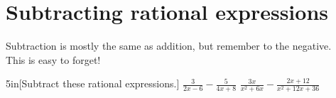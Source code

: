 \section{Subtracting rational expressions}


\begin{myCenteredBox}[width=4.25in,]
    Subtraction is mostly the same as addition, 
    but remember to  the negative.\\
    \vspace{1em}
    This is easy to forget!
\end{myCenteredBox}

\begin{my2Problems}{5in}[Subtract these rational expressions.]
    {
        $
        \frac{3}{2x-6}
        -
        \frac{5}{4x+8}
        $
    }
    {
        $
        \frac{3x}{x^2+6x}
        -
        \frac{2x+12}{x^2+12x+36}
        $
    }
\end{my2Problems}
